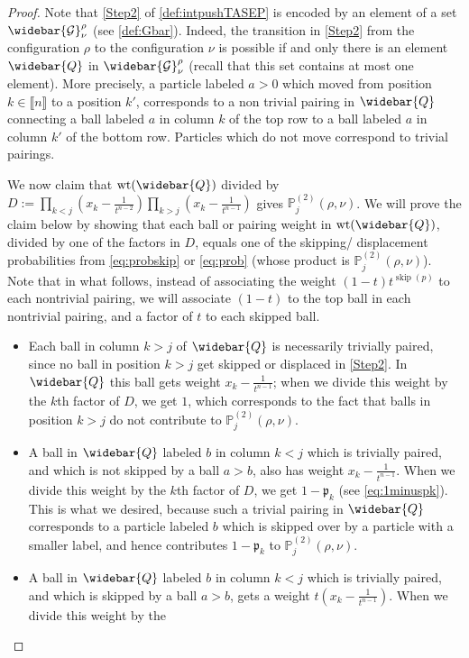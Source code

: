 \documentclass[12pt]{amsart}
\theoremstyle{definition}
\DeclareMathOperator{\wt}{wt}
\DeclareMathOperator{\skipped}{skip}
\newcommand{\Gbar}{\widebar{\mathcal{G}}}
\newcommand{\Qbar}{\widebar{Q}}
\newcommand{\PPtwo}[1]{\mathbb P^{(2)}_{#1}}
\newcommand{\mfp}{\mathfrak p}
\begin{document}
\begin{proof}
 Note that \ref{Step2} of \cref{def:intpushTASEP} is encoded by 
an element of a set $\Gbar^{\rho}_{\nu}$ (see \cref{def:Gbar}).  
Indeed, the transition in \ref{Step2} from the configuration $\rho$ to the configuration $\nu$ is possible if and only there is an
element $\Qbar$ in $\Gbar^{\rho}_\nu$ (recall that this set contains at most one element).
More precisely,  a particle labeled $a>0$ which moved from position $k\in \llbracket n\rrbracket$ to a position $k'$, corresponds to a non trivial pairing in $\Qbar$ connecting a ball labeled $a$ in column $k$ of the top row to a ball labeled $a$ in column $k'$ of the bottom row. Particles which do not move correspond to trivial pairings. 

We now claim that $\wt(\Qbar)$ divided by 
$D:=\prod_{k<j}\left(x_k-\frac{1}{t^{n-2}}\right)\prod_{k>j}\left(x_k-\frac{1}{t^{n-1}}\right)$ gives $\PPtwo{j}(\rho,\nu)$.  We will prove the claim below by showing that each 
ball or pairing weight in $\wt(\Qbar)$,
divided by one of the factors in $D$, equals one of the skipping/ displacement
probabilities from \eqref{eq:probskip} or \eqref{eq:prob} (whose product is $\PPtwo{j}(\rho,\nu)$).  Note that in what follows,
instead of associating the weight 
$(1-t)t^{\skipped(p)}$ to each nontrivial pairing,
we will associate $(1-t)$ to the top ball in each nontrivial pairing,
and a factor of $t$ to each skipped ball.
\begin{itemize}
    \item Each ball in column $k>j$ of $\Qbar$ is necessarily trivially paired, since no ball in position $k>j$ get skipped or displaced in \ref{Step2}.
      In $\Qbar$ this ball gets  weight $x_k-\frac{1}{t^{n-1}}$; when we divide this weight by the $k$th factor of $D$, we get $1$, which corresponds to the fact that balls in position $k>j$ do not contribute to $\PPtwo{j}(\rho,\nu)$.
        \item A ball in $\Qbar$ labeled $b$ in column $k<j$ which is trivially paired, and which is not skipped by a ball $a>b$, also has weight $x_k-\frac{1}{t^{n-1}}$. When we divide this weight by the $k$th factor of $D$, we get $1-\mfp_k$ (see \eqref{eq:1minuspk}).  This is what we desired, because such a trivial pairing in $\Qbar$ corresponds to a particle labeled $b$ which is skipped over by a particle with a smaller label, and hence contributes $1-\mfp_k$
        to $\PPtwo{j}(\rho,\nu)$.
    \item A ball in $\Qbar$ labeled $b$ in column $k<j$ which is trivially paired, and which is skipped by a ball $a>b$, gets a weight $t(x_k-\frac{1}{t^{n-1}})$.  When we divide this weight by the 

\end{itemize}
\end{proof}
\end{document}
